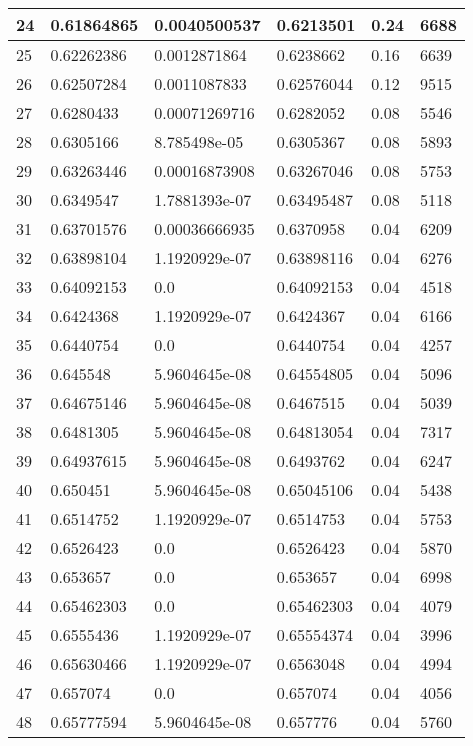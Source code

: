 \begin{longtable}{|l|l|l|l|l|l|}
24 & 0.61864865 & 0.0040500537 & 0.6213501 & 0.24 & 6688 \\ \hline 
25 & 0.62262386 & 0.0012871864 & 0.6238662 & 0.16 & 6639 \\ \hline 
26 & 0.62507284 & 0.0011087833 & 0.62576044 & 0.12 & 9515 \\ \hline 
27 & 0.6280433 & 0.00071269716 & 0.6282052 & 0.08 & 5546 \\ \hline 
28 & 0.6305166 & 8.785498e-05 & 0.6305367 & 0.08 & 5893 \\ \hline 
29 & 0.63263446 & 0.00016873908 & 0.63267046 & 0.08 & 5753 \\ \hline 
30 & 0.6349547 & 1.7881393e-07 & 0.63495487 & 0.08 & 5118 \\ \hline 
31 & 0.63701576 & 0.00036666935 & 0.6370958 & 0.04 & 6209 \\ \hline 
32 & 0.63898104 & 1.1920929e-07 & 0.63898116 & 0.04 & 6276 \\ \hline 
33 & 0.64092153 & 0.0 & 0.64092153 & 0.04 & 4518 \\ \hline 
34 & 0.6424368 & 1.1920929e-07 & 0.6424367 & 0.04 & 6166 \\ \hline 
35 & 0.6440754 & 0.0 & 0.6440754 & 0.04 & 4257 \\ \hline 
36 & 0.645548 & 5.9604645e-08 & 0.64554805 & 0.04 & 5096 \\ \hline 
37 & 0.64675146 & 5.9604645e-08 & 0.6467515 & 0.04 & 5039 \\ \hline 
38 & 0.6481305 & 5.9604645e-08 & 0.64813054 & 0.04 & 7317 \\ \hline 
39 & 0.64937615 & 5.9604645e-08 & 0.6493762 & 0.04 & 6247 \\ \hline 
40 & 0.650451 & 5.9604645e-08 & 0.65045106 & 0.04 & 5438 \\ \hline 
41 & 0.6514752 & 1.1920929e-07 & 0.6514753 & 0.04 & 5753 \\ \hline 
42 & 0.6526423 & 0.0 & 0.6526423 & 0.04 & 5870 \\ \hline 
43 & 0.653657 & 0.0 & 0.653657 & 0.04 & 6998 \\ \hline 
44 & 0.65462303 & 0.0 & 0.65462303 & 0.04 & 4079 \\ \hline 
45 & 0.6555436 & 1.1920929e-07 & 0.65554374 & 0.04 & 3996 \\ \hline 
46 & 0.65630466 & 1.1920929e-07 & 0.6563048 & 0.04 & 4994 \\ \hline 
47 & 0.657074 & 0.0 & 0.657074 & 0.04 & 4056 \\ \hline 
48 & 0.65777594 & 5.9604645e-08 & 0.657776 & 0.04 & 5760 \\ \hline 

\end{longtable}
